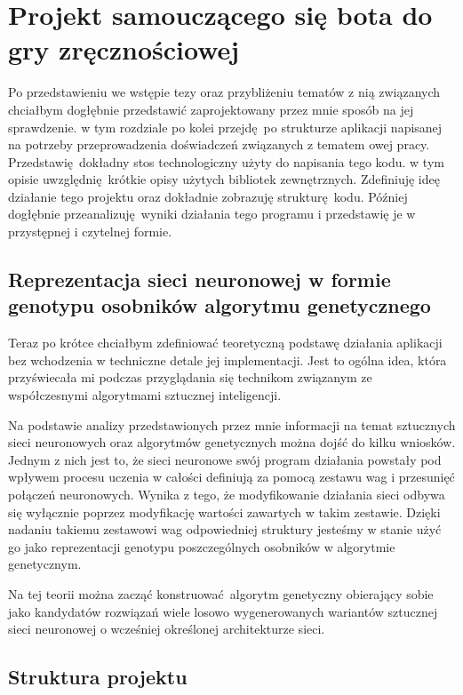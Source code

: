 \documentclass[12pt, oneside, a4paper]{report}
\begin{document}

\chapter{Projekt samouczącego się bota do gry zręcznościowej}

Po przedstawieniu we wstępie tezy oraz przybliżeniu tematów z nią związanych chciałbym dogłębnie przedstawić zaprojektowany przez mnie sposób na jej sprawdzenie. w tym rozdziale po kolei przejdę po strukturze aplikacji napisanej na potrzeby przeprowadzenia doświadczeń związanych z tematem owej pracy. Przedstawię dokładny stos technologiczny użyty do napisania tego kodu. w tym opisie uwzględnię krótkie opisy użytych bibliotek zewnętrznych. Zdefiniuję ideę działanie tego projektu oraz dokładnie zobrazuję strukturę kodu. Później dogłębnie przeanalizuję wyniki działania tego programu i przedstawię je w przystępnej i czytelnej formie.

\section{Reprezentacja sieci neuronowej w formie genotypu osobników algorytmu genetycznego}

Teraz po krótce chciałbym zdefiniować teoretyczną podstawę działania aplikacji bez wchodzenia w techniczne detale jej implementacji. Jest to ogólna idea, która przyświecała mi podczas przyglądania się technikom związanym ze współczesnymi algorytmami sztucznej inteligencji.

Na podstawie analizy przedstawionych przez mnie informacji na temat sztucznych sieci neuronowych oraz algorytmów genetycznych można dojść do kilku wniosków. Jednym z nich jest to, że sieci neuronowe swój program działania powstały pod wpływem procesu uczenia w całości definiują za pomocą zestawu wag i przesunięć połączeń neuronowych. Wynika z tego, że modyfikowanie działania sieci odbywa się wyłącznie poprzez modyfikację wartości zawartych w takim zestawie. Dzięki nadaniu takiemu zestawowi wag odpowiedniej struktury jesteśmy w stanie użyć go jako reprezentacji genotypu poszczególnych osobników w algorytmie genetycznym.

Na tej teorii można zacząć konstruować algorytm genetyczny obierający sobie jako kandydatów rozwiązań wiele losowo wygenerowanych wariantów sztucznej sieci neuronowej o wcześniej określonej architekturze sieci.

\section{Struktura projektu}
\end{document}
